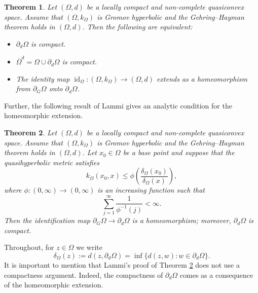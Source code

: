 \documentclass[a4paper,12pt]{amsart}
\newtheorem{thm}{Theorem}[section]
\theoremstyle{definition}
\begin{document}
\begin{thm}\cite[Theorem 1.1]{Lammi-Thesis}\label{topological condition}
	Let $(\Omega,d)$ be a locally compact and non-complete quasiconvex space. Assume that $(\Omega, k_{\Omega})$ is Gromov hyperbolic and the Gehring--Hayman theorem holds in $(\Omega,d)$. Then the following are equivalent:
	\begin{itemize}
		\item[(i)] $\partial_{d}\Omega$ is compact.
		\item[(ii)] $\overline{\Omega}^d=\Omega\cup\partial_{d}\Omega$ is compact.
		\item[(iii)] The identity map $\operatorname{id}_{\Omega}: (\Omega,k_{\Omega})\to (\Omega,d)$ extends as a homeomorphism from $\partial_{G}\Omega$ onto $\partial_d\Omega$.
	\end{itemize}
\end{thm}

Further, the following result of Lammi \cite{Lammi-2011} gives an analytic condition for the homeomorphic extension.

\begin{thm}\cite[Theorem 1.1]{Lammi-2011}\label{analytic condition}
	Let $(\Omega,d)$ be a locally compact and non-complete quasiconvex space. Assume that $(\Omega, k_{\Omega})$ is Gromov hyperbolic and the Gehring--Hayman theorem holds in $(\Omega,d)$.
	Let $x_0\in \Omega$ be a base point and suppose that the quasihyperbolic metric satisfies
	$$
	k_{\Omega}(x_0,x)\le \phi\left(\frac{\delta_{\Omega}(x_0)}{\delta_{\Omega}(x)}\right),
	$$
	where $\phi:(0,\infty)\to (0,\infty)$ is an increasing function such that
	$$
	\sum_{j=1}^{\infty}\frac{1}{\phi^{-1}(j)}<\infty.
	$$
	Then the identification map $\partial_{G}\Omega\to \partial_d\Omega$ is a homeomorphism; moreover, $\partial_d\Omega$ is compact.
\end{thm}

Throughout, for $z\in\Omega$ we write
	\[
	\delta_\Omega(z):=d(z,\partial_d\Omega)=\inf\{d(z,w):w\in\partial_d\Omega\}.
	\]
It is important to mention that Lammi's proof of Theorem \ref{analytic condition} does not use a compactness argument. Indeed, the compactness of $\partial_d\Omega$ comes as a consequence of the homeomorphic extension.
\end{document}
